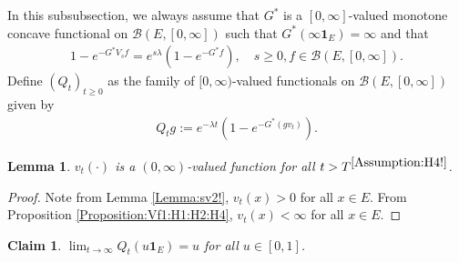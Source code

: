 \documentclass[12pt,a4paper]{amsart}
\numberwithin{equation}{section}
\theoremstyle{plain}
\newtheorem{lem}[thm]{Lemma}
\newtheorem{claim}[thm]{Claim}
\theoremstyle{definition}
\theoremstyle{remark}
\newcounter{N}
\newcounter{n}[N]
\begin{document}
	In this subsubsection, 
	we always assume that $G^*$ is a $[0,\infty]$-valued monotone concave functional on $\mathcal B(E,[0,\infty])$ such that $G^*(\infty \mathbf 1_E) = \infty$ and that
\begin{align}
  1 - e^{- G^* V_sf}
  = e^{s\lambda} (1- e^{- G^* f}),
  \quad s \geq 0, f \in \mathcal B(E, [0,\infty]).
  \end{align}
Define $(Q_t)_{t\geq 0}$ as the family of $[0,\infty)$-valued functionals on $\mathcal B(E,[0,\infty])$ given by
\begin{align}
 Q_tg
:= e^{- \lambda t}( 1 - e^{-G^*(gv_t)} ).
 \end{align}
\begin{lem} \label{Lemma:vp:H1:H2:H3:H4}
$v_t(\cdot)$ is a $(0,\infty)$-valued function for all $t> T^{\ref{Assumption:H4!}}$.
\end{lem}
\begin{proof}
Note from Lemma \ref{Lemma:sv2!}, $v_t(x)>0$ for all $x\in E$.
From Proposition \ref{Proposition:Vf1:H1:H2:H4}, $v_t(x)<\infty$ for all $x\in E$.
\end{proof}
\begin{claim} \label{Claim:GQ:H1:H2:H3:H4}
 $\lim_{t\to \infty} Q_t(u \mathbf 1_E) = u$ for all $u\in [0,1]$.
\end{claim}
\end{document}
